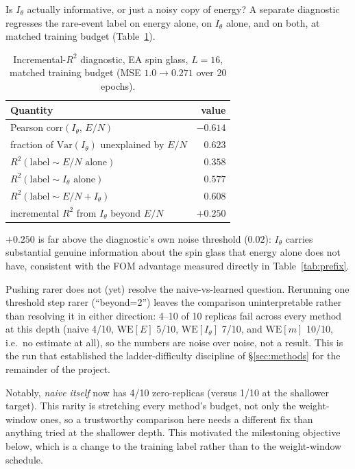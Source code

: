 \documentclass[a4paper,fleqn]{cas-sc}
\begin{document}
	Is $I_\theta$ actually informative, or just a noisy copy of energy? A separate
	diagnostic regresses the rare-event label on energy alone, on $I_\theta$ alone, and on
	both, at matched training budget (Table~\ref{tab:diagnostic}).
	
	\begin{table}[H]
		\centering\small
		\caption{Incremental-$R^2$ diagnostic, EA spin glass, $L=16$, matched training budget
			(MSE $1.0\to0.271$ over 20 epochs).}
		\label{tab:diagnostic}
		\begin{tabular}{lr}
			\toprule
			Quantity & value \\
			\midrule
			Pearson corr$(I_\theta,\,E/N)$ & $-0.614$ \\
			fraction of $\mathrm{Var}(I_\theta)$ unexplained by $E/N$ & $0.623$ \\
			$R^2(\text{label}\sim E/N\text{ alone})$ & $0.358$ \\
			$R^2(\text{label}\sim I_\theta\text{ alone})$ & $0.577$ \\
			$R^2(\text{label}\sim E/N+I_\theta)$ & $0.608$ \\
			incremental $R^2$ from $I_\theta$ beyond $E/N$ & $+0.250$ \\
			\bottomrule
		\end{tabular}
	\end{table}
	
	$+0.250$ is far above the diagnostic's own noise threshold ($0.02$): $I_\theta$ carries
	substantial genuine information about the spin glass that energy alone does not have,
	consistent with the FOM advantage measured directly in Table~\ref{tab:prefix}.
	
	Pushing rarer does not (yet) resolve the naive-vs-learned question. Rerunning one
	threshold step rarer (``beyond=2'') leaves the comparison uninterpretable rather than
	resolving it in either direction: 4--10 of 10 replicas fail across every method at this
	depth (naive 4/10, $\mathrm{WE}[E]$ 5/10, $\mathrm{WE}[I_\theta]$ 7/10, and
	$\mathrm{WE}[m]$ 10/10, i.e.\ no estimate at all), so the numbers are noise over noise,
	not a result. This
	is the run that established the ladder-difficulty discipline of \S\ref{sec:methods} for the
	remainder of the project.
	
	Notably, \emph{naive itself} now has 4/10 zero-replicas (versus 1/10 at the shallower
	target). This rarity is stretching every method's budget, not only the weight-window
	ones, so a trustworthy comparison here needs a different fix than anything tried at the
	shallower depth. This motivated the milestoning objective below, which is a change to the
	training label rather than to the weight-window schedule.
	
\end{document}
